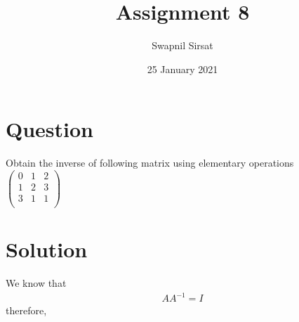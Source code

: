 \documentclass{article}
\title{Assignment 8}
\author{Swapnil Sirsat}
\date{25 January 2021}
\begin{document}
\maketitle

\section{Question}
Obtain the inverse of following matrix using elementary operations\\
$\begin{pmatrix}
0 & 1 & 2\\
1 & 2 & 3\\
3 & 1 & 1\\
\end{pmatrix}$
\section{Solution}
We know that
\begin{gather*}
    AA^{-1} = I
\end{gather*}
therefore,
\end{document}
